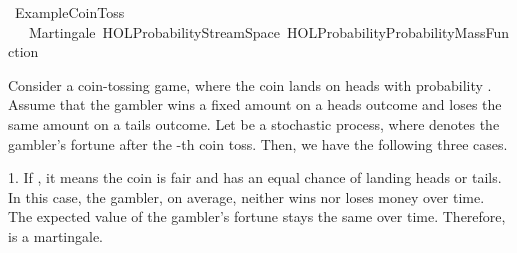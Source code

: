 %
\begin{isabellebody}%
%
%
\isadelimtheory
\isanewline
\isanewline
%
\endisadelimtheory
%
\isatagtheory
{}\isamarkupfalse%
\ Example{\isacharunderscore}{\kern0pt}Coin{\isacharunderscore}{\kern0pt}Toss\isanewline
\ \ \ Martingale\ {\isachardoublequoteopen}HOL{\isacharminus}{\kern0pt}Probability{\isachardot}{\kern0pt}Stream{\isacharunderscore}{\kern0pt}Space{\isachardoublequoteclose}\ {\isachardoublequoteopen}HOL{\isacharminus}{\kern0pt}Probability{\isachardot}{\kern0pt}Probability{\isacharunderscore}{\kern0pt}Mass{\isacharunderscore}{\kern0pt}Function{\isachardoublequoteclose}\isanewline
{}%
\endisatagtheory
{\isafoldtheory}%
%
\isadelimtheory
%
\endisadelimtheory
%
\isadelimdocument
%
\endisadelimdocument
%
\isatagdocument
%
\isamarkuptrue%
%
\endisatagdocument
{\isafolddocument}%
%
\isadelimdocument
%
\endisadelimdocument
%
\begin{isamarkuptext}%
Consider a coin-tossing game, where the coin lands on heads with probability . Assume that the gambler wins a fixed amount  on a heads outcome 
      and loses the same amount  on a tails outcome. Let  be a stochastic process, where  denotes the gambler’s fortune after the -th coin toss. 
      Then, we have the following three cases.%
\end{isamarkuptext}\isamarkuptrue%
%
\begin{isamarkuptext}%
1. If , it means the coin is fair and has an equal chance of landing heads or tails. 
      In this case, the gambler, on average, neither wins nor loses money over time. The expected value of the gambler’s fortune stays the same over time. 
      Therefore,  is a martingale.%
\end{isamarkuptext}\isamarkuptrue%
%
\begin{isamarkuptext}%

\end{isamarkuptext}
\end{isabellebody}
